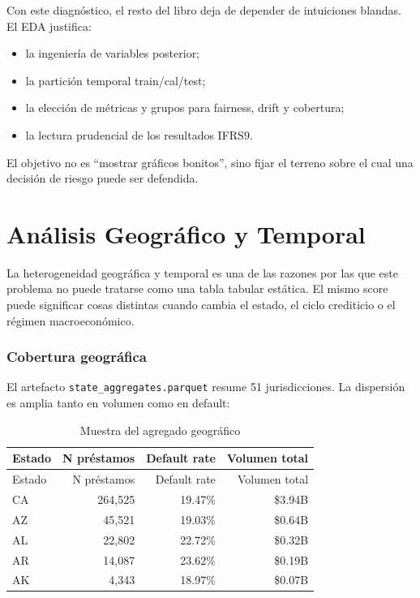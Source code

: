 \documentclass[
  spanish,
  11pt,
  letterpaper,
]{scrbook}
\providecommand{\tightlist}{%
  \setlength{\itemsep}{0pt}\setlength{\parskip}{0pt}}
\theoremstyle{plain}
\theoremstyle{remark}
\begin{document}
Con este diagnóstico, el resto del libro deja de depender de intuiciones
blandas. El EDA justifica:

\begin{itemize}
\tightlist
\item
  la ingeniería de variables posterior;
\item
  la partición temporal train/cal/test;
\item
  la elección de métricas y grupos para fairness, drift y cobertura;
\item
  la lectura prudencial de los resultados IFRS9.
\end{itemize}

El objetivo no es ``mostrar gráficos bonitos'', sino fijar el terreno
sobre el cual una decisión de riesgo puede ser defendida.

\chapter{Análisis Geográfico y Temporal}\label{sec-geographic-temporal}

La heterogeneidad geográfica y temporal es una de las razones por las
que este problema no puede tratarse como una tabla tabular estática. El
mismo score puede significar cosas distintas cuando cambia el estado, el
ciclo crediticio o el régimen macroeconómico.

\subsection{Cobertura geográfica}\label{cobertura-geogruxe1fica}

El artefacto \texttt{state\_aggregates.parquet} resume 51
jurisdicciones. La dispersión es amplia tanto en volumen como en
default:

\begin{longtable}[]{@{}lrrr@{}}
\caption{Muestra del agregado
geográfico}\label{tbl-state-sample}\tabularnewline
\toprule\noalign{}
Estado & N préstamos & Default rate & Volumen total \\
\midrule\noalign{}
\endfirsthead
\toprule\noalign{}
Estado & N préstamos & Default rate & Volumen total \\
\midrule\noalign{}
\endhead
\bottomrule\noalign{}
\endlastfoot
CA & 264,525 & 19.47\% & \$3.94B \\
AZ & 45,521 & 19.03\% & \$0.64B \\
AL & 22,802 & 22.72\% & \$0.32B \\
AR & 14,087 & 23.62\% & \$0.19B \\
AK & 4,343 & 18.97\% & \$0.07B \\
\end{longtable}
\end{document}
